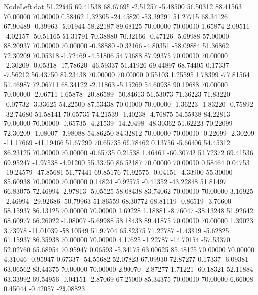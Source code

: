\begin{filecontents}{NodeLeft.dat}
  51.22645   69.41538   68.67695    -2.51257   -5.48500   56.50312   88.41563   70.00000   70.00000    0.58462    1.32305  -24.45820  -53.39291
  51.27715   68.34126   67.90489    -0.39963   -5.01944   58.22187   89.68125   70.00000   70.00000    1.65874    2.09511   -4.02157  -50.51165
  51.31791   70.38880   70.32166    -0.47126   -5.69988   57.00000   88.20937   70.00000   70.00000   -0.38880   -0.32166   -4.80351  -58.09884
  51.36862   72.30209   70.05318    -1.72469   -4.51806   54.79688   87.99375   70.00000   70.00000   -2.30209   -0.05318  -17.78620  -46.59337
  51.41926   69.44897   68.74405     0.17337   -7.56212   56.43750   89.23438   70.00000   70.00000    0.55103    1.25595    1.78399  -77.81564
  51.46987   72.06711   68.34122    -2.11863   -5.16269   54.60938   90.19688   70.00000   70.00000   -2.06711    1.65878  -20.86589  -50.84613
  51.53073   71.36223   71.83220    -0.07732   -3.33625   54.22500   87.53438   70.00000   70.00000   -1.36223   -1.83220   -0.75892  -32.74680
  51.58141   70.65735   74.21539    -1.40238   -4.76875   54.55938   84.22813   70.00000   70.00000   -0.65735   -4.21539  -14.20498  -48.30362
  51.62223   70.22099   72.30209    -1.08007   -3.98088   54.86250   84.32812   70.00000   70.00000   -0.22099   -2.30209  -11.17669  -41.19466
  51.67299   70.65735   69.78462     0.13756   -5.66406   54.45312   86.23125   70.00000   70.00000   -0.65735    0.21538    1.46461  -60.30742
  51.72372   69.41536   69.95247    -1.97538   -4.91200   55.33750   86.52187   70.00000   70.00000    0.58464    0.04753  -19.24579  -47.85681
  51.77441   69.85176   70.92575    -0.04151   -4.33900   55.30000   85.60938   70.00000   70.00000    0.14824   -0.92575   -0.41352  -43.22848
  51.81497   66.83075   72.46994    -2.97813   -5.05525   58.08438   83.74062   70.00000   70.00000    3.16925   -2.46994  -29.92686  -50.79963
  51.86559   68.30772   68.81119    -0.86519   -3.76600   58.15937   86.13125   70.00000   70.00000    1.69228    1.18881   -8.76047  -38.13248
  51.92642   68.60977   66.26022    -1.08007   -5.69988   58.18438   89.41875   70.00000   70.00000    1.39023    3.73978  -11.01039  -58.10549
  51.97704   65.82375   71.22787    -1.43819   -5.62825   61.15937   86.35938   70.00000   70.00000    4.17625   -1.22787  -14.70164  -57.53370
  52.02760   65.68954   70.95947     0.06593   -5.34175   63.00625   85.48125   70.00000   70.00000    4.31046   -0.95947    0.67337  -54.55682
  52.07823   67.09930   72.87277     0.17337   -6.09381   63.06562   83.44375   70.00000   70.00000    2.90070   -2.87277    1.71221  -60.18321
  52.11884   63.33992   69.54956    -0.04151   -2.87069   67.25000   85.34375   70.00000   70.00000    6.66008    0.45044   -0.42057  -29.08823

\end{filecontents}
